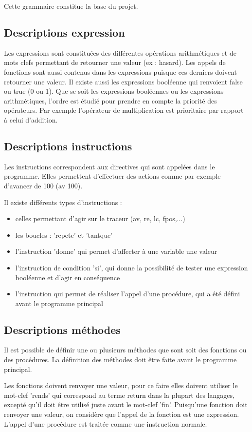 \documentclass[a4paper,11pt]{article}
\begin{document}
Cette grammaire constitue la base du projet.

\subsection{Descriptions expression}
Les expressions sont constituées des différentes opérations arithmétiques et de mots clefs permettant de retourner une valeur (ex : hasard). Les appels de fonctions sont aussi contenus dans les expressions puisque ces derniers doivent retourner une valeur.
Il existe aussi les expressions booléenne qui renvoient false ou true (0 ou 1).
Que se soit les expressions booléennes ou les expressions arithmétiques, l'ordre est étudié pour prendre en compte la priorité des opérateurs. Par exemple l'opérateur de multiplication est prioritaire par rapport à celui d'addition.

\subsection{Descriptions instructions}
Les instructions correspondent aux directives qui sont appelées dans le programme. Elles permettent d'effectuer des actions comme par exemple d'avancer de 100 (av 100).

Il existe différents types d'instructions :
\begin{itemize}
	\item celles permettant d'agir sur le traceur (av, re, lc, fpos,...)
	\item les boucles : 'repete' et 'tantque'
	\item l'instruction 'donne' qui permet d'affecter à une variable une valeur
	\item l'instruction de condition 'si', qui donne la possibilité de tester une expression booléenne et d'agir en conséquence
	\item l'instruction qui permet de réaliser l'appel d'une procédure, qui a été défini avant le programme principal
\end{itemize}

\subsection{Descriptions méthodes}
Il est possible de définir une ou plusieurs méthodes que sont soit des fonctions ou des procédures. La définition des méthodes doit être faite avant le programme principal.

Les fonctions doivent renvoyer une valeur, pour ce faire elles doivent utiliser le mot-clef 'rends' qui correspond au terme return dans la plupart des langages, excepté qu'il doit être utilisé juste avant le mot-clef 'fin'.
Puisqu'une fonction doit renvoyer une valeur, on considère que l'appel de la fonction est une expression.
L'appel d'une procédure est traitée comme une instruction normale.
\end{document}
